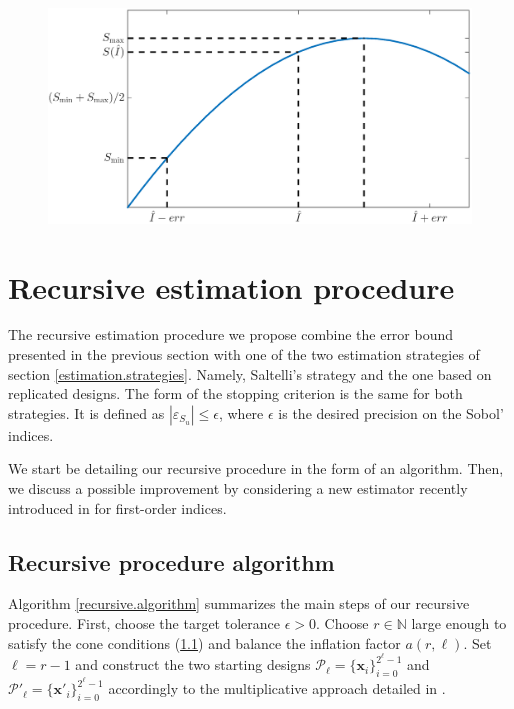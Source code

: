 \documentclass[]{elsarticle}
\theoremstyle{definition}
\newcommand{\bvec}[1]{\boldsymbol{#1}}
\newcommand{\vx}{\bvec{x}}
\def\abs#1{\ensuremath{\left \lvert #1 \right \rvert}}
\begin{document}
\begin{figure}\centering
\includegraphics[width=1.\textwidth]{Images/scheme_S.eps}
\end{figure}

\section{Recursive estimation procedure}
\label{section.recursive.procedure}

The recursive estimation procedure we propose combine the error bound presented in the previous section with one of the two estimation strategies of section \ref{estimation.strategies}. Namely, Saltelli's strategy and the one based on replicated designs. The form of the stopping criterion is the same for both strategies. It is defined as $\abs{\varepsilon_{S_u}} \leq \epsilon$, where $\epsilon$ is the desired precision on the Sobol' indices.

We start be detailing our recursive procedure in the form of an algorithm. Then, we discuss a possible improvement by considering a new estimator recently introduced in \cite{Owen} for first-order indices.

\subsection{Recursive procedure algorithm}

Algorithm \ref{recursive.algorithm} summarizes the main steps of our recursive procedure. First, choose the target tolerance $\epsilon >0$. Choose $r \in \mathbb{N}$ large enough to satisfy the cone conditions (\ref{}) and balance the inflation factor $a(r,\ell)$. Set $\ell=r-1$ and construct the two starting designs $\mathcal{P}_{\ell}=\{\vx_i\}_{i=0}^{2^\ell-1}$ and $\mathcal{P}'_{\ell}=\{\vx'_i\}_{i=0}^{2^\ell-1}$ accordingly to the multiplicative approach detailed in \cite{crass}.
\end{document}
